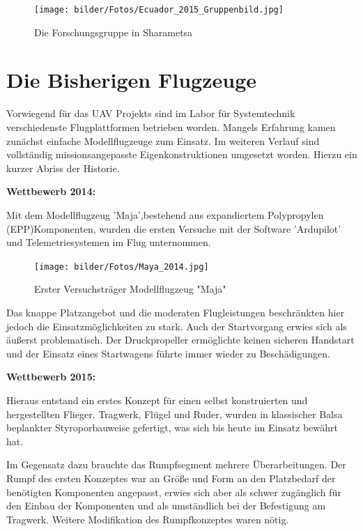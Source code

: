 \begin{figure}[H]
\centering
\texttt{[image: bilder/Fotos/Ecuador\_2015\_Gruppenbild.jpg]} 
\caption{Die Forschungsgruppe in Sharametsa} 
\label{Die Forschungsgruppe in Sharametsa}
\end{figure}

\clearpage

\section{Die Bisherigen Flugzeuge}

Vorwiegend für das UAV Projekts sind im Labor für Systemtechnik verschiedenste Flugplattformen betrieben worden. Mangels Erfahrung kamen zunächst einfache Modellflugzeuge zum Einsatz. Im weiteren Verlauf sind vollständig missionsangepasste Eigenkonstruktionen umgesetzt worden.
Hierzu ein kurzer Abriss der Historie.

\vspace{7.5mm}

\textbf{Wettbewerb 2014:}

Mit dem Modellflugzeug 'Maja',bestehend aus expandiertem Polypropylen (EPP)Komponenten, wurden die ersten Versuche mit der Software 'Ardupilot' und Telemetriesystemen im Flug unternommen.

\begin{figure}[H]
\centering
\texttt{[image: bilder/Fotos/Maya\_2014.jpg]} 
\caption{Erster Versuchsträger Modellflugzeug "Maja"} 
\label{Erster Versuchsträger Modellflugzeug "Maja"}
\end{figure}

Das knappe Platzangebot und die moderaten Flugleistungen beschränkten hier jedoch die Einsatzmöglichkeiten zu stark. Auch der Startvorgang erwies sich als äußerst problematisch. Der Druckpropeller ermöglichte keinen sicheren Handstart und der Einsatz eines Startwagens führte immer wieder zu Beschädigungen.

\clearpage

\textbf{Wettbewerb 2015:}

Hieraus entstand ein erstes Konzept für einen selbst konstruierten und hergestellten Flieger. Tragwerk, Flügel und Ruder, wurden in klassischer Balsa beplankter Styroporbauweise gefertigt, was sich bis heute im Einsatz bewährt hat. 

Im Gegensatz dazu brauchte das Rumpfsegment mehrere Überarbeitungen. Der Rumpf des ersten Konzeptes war an Größe und Form an den Platzbedarf der benötigten Komponenten angepasst, erwies sich aber als schwer zugänglich für den Einbau der Komponenten und als umständlich bei der Befestigung am Tragwerk. Weitere Modifikation des Rumpfkonzeptes waren nötig.

